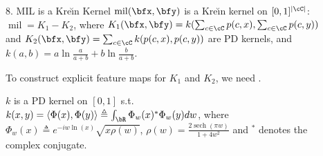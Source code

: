 \documentclass[final]{beamer}
\newcommand{\kr}{Kre\u{\i}n\xspace}
\DeclareMathOperator{\sech}{sech}
\DeclareMathOperator{\mil}{mil}
\newlength{\sepwid}
\newlength{\onecolwid}
\newlength{\threecolwid}
\begin{document}
\begin{frame}[t]
\begin{columns}[t]
\begin{column}{\threecolwid}
\begin{block}{8. MIL is a \kr Kernel}
 			 $ \mil(\bfx,\bfy) $ is a \kr kernel on 
 			$ 
 			[0,1]^{|\cC|} $: $ \mil=K_1-K_2 $,
 			 where $ 
 			K_1(\bfx,\bfy) = k(\sum_{c\in \cC}p(c,x), \sum_{c\in \cC}p(c,y)) $ 
 			and
 			 $ 
 			K_2(\bfx,\bfy)=\sum_{c\in \cC} k(p(c,x),p(c,y)) $ are PD kernels, 
 			and
 			$
 			k(a,b) = a\ln\frac{a}{a+b}+b\ln\frac{b}{a+b}
 			$.

 		
 		To construct explicit feature maps 
 		for $ K_1 $ and $ K_2 $, we need .
 		
 			 $ k $ is a PD kernel on $ [0,1] $ 
 			s.t.\ 
 			$ k(x,y) = \langle \Phi(x),\Phi(y)\rangle \triangleq \int_\bR \Phi_w(x)^* \Phi_w(y) dw $, 
 			where $
 			\Phi_w(x) \triangleq e^{-iw\ln(x)}
 			\sqrt{x
 			\rho(w)}$, $\rho(w)=\frac{2\sech(\pi 
 			w)}{1+4w^2}$ and $^*$ denotes the complex conjugate.

 		
 		
 		
 		
\end{block}
\end{column} %
\begin{column}{\sepwid}
    
\end{column}
\begin{column}{\onecolwid}
\vspace{-40pt}
    

\end{column}
\end{columns}
\end{frame}
\end{document}
